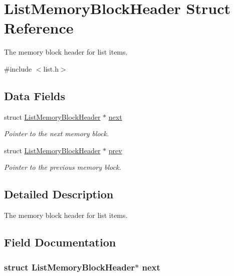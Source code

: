 \hypertarget{struct_list_memory_block_header}{\section{List\-Memory\-Block\-Header Struct Reference}
\label{struct_list_memory_block_header}
}


The memory block header for list items.  




{\ttfamily \#include $<$list.\-h$>$}

\subsection*{Data Fields}
\begin{DoxyCompactItemize}
\item 
struct \hyperlink{struct_list_memory_block_header}{List\-Memory\-Block\-Header} $\ast$ \hyperlink{struct_list_memory_block_header_aeb4318b8c07d7035f19be4c85bee6e78}{next}
\begin{DoxyCompactList}\small\item\em Pointer to the next memory block. \end{DoxyCompactList}\item 
struct \hyperlink{struct_list_memory_block_header}{List\-Memory\-Block\-Header} $\ast$ \hyperlink{struct_list_memory_block_header_a0a2cc3c0c86933e07d7871bc1fccdfe5}{prev}
\begin{DoxyCompactList}\small\item\em Pointer to the previous memory block. \end{DoxyCompactList}\end{DoxyCompactItemize}


\subsection{Detailed Description}
The memory block header for list items. 

\subsection{Field Documentation}
\hypertarget{struct_list_memory_block_header_aeb4318b8c07d7035f19be4c85bee6e78}{
\subsubsection[{next}]{\setlength{\rightskip}{0pt plus 5cm}struct {\bf List\-Memory\-Block\-Header}$\ast$ next}}\label{struct_list_memory_block_header_aeb4318b8c07d7035f19be4c85bee6e78}


